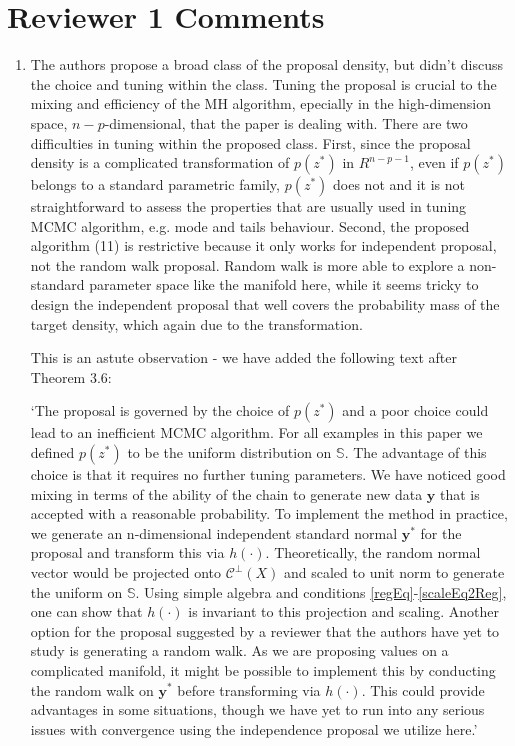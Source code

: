 \documentclass{article}
\newcommand{\mb}{\mathbf}
\newcommand{\mc}{\mathcal}
\newcommand{\response}[1]{{\color{blue}#1}}
\begin{document}
\section{Reviewer 1 Comments}

\begin{enumerate}
\item The authors propose a broad class of the proposal density, but didn't discuss the choice and tuning within the class. Tuning the proposal is crucial to the mixing and efficiency of the MH algorithm, epecially in the high-dimension space, $n-p$-dimensional, that the paper is dealing with. There are two difficulties in tuning within the proposed class. First, since the proposal density is a complicated transformation of $p(z^{*})$ in $R^{n-p-1}$, even if $p(z^{*})$ belongs to a standard parametric family, $p(z^{*})$ does not and it is not straightforward to assess the properties that are usually used in tuning MCMC algorithm, e.g. mode and
tails behaviour. Second, the proposed algorithm (11) is restrictive because it only works for independent proposal, not the random walk proposal. Random walk is more able to explore a non-standard parameter space like the manifold here, while it seems tricky to design the independent proposal that well covers the probability mass of the target density, which again due to the transformation.

\response{This is an astute observation - we have added the following text after Theorem 3.6:

`The proposal is governed by the choice of $p(z^{*})$ and a poor choice could lead to an inefficient MCMC algorithm. For all examples in this paper we defined $p(z^{*})$ to be the uniform distribution on $\mathbb{S}$. The advantage of this choice is that it requires no further tuning parameters.  We have noticed good mixing in terms of the ability of the chain to generate new data $\mb y$ that is accepted with a reasonable probability. To implement the method in practice, we generate an n-dimensional independent standard normal $\mb y^{*}$ for the proposal and transform this via $h(\cdot)$. Theoretically, the random normal vector would be projected onto $\mc{C}^{\perp}(X)$ and scaled to unit norm to generate the uniform on $\mathbb{S}$. Using simple algebra and conditions \ref{regEq}-\ref{scaleEq2Reg}, one can show that $h(\cdot)$ is invariant to this projection and scaling. Another option for the proposal suggested by a reviewer that the authors have yet to study is generating a random walk. As we are proposing values on a complicated manifold, it might be possible to implement this by conducting the random walk on $\mb y^{*}$ before transforming via $h(\cdot)$. This could provide advantages in some situations, though we have yet to run into any serious issues with convergence using the independence proposal we utilize here.'


}
\end{enumerate}
\end{document}
